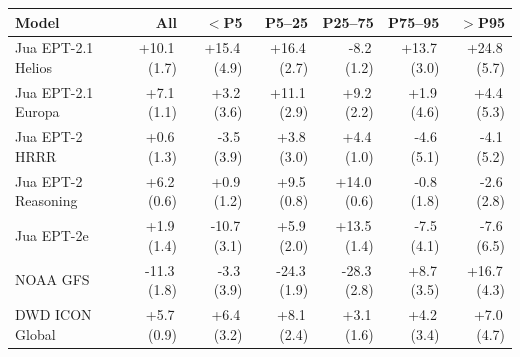\begin{tabular}{@{}lrrrrrr@{}}
\toprule
Model & All & $<$P5 & P5--25 & P25--75 & P75--95 & $>$P95 \\
\midrule
Jua EPT-2.1 Helios & +10.1\,(1.7) & +15.4\,(4.9) & +16.4\,(2.7) & -8.2\,(1.2) & +13.7\,(3.0) & +24.8\,(5.7) \\\addlinespace[0.35em]
Jua EPT-2.1 Europa & +7.1\,(1.1) & +3.2\,(3.6) & +11.1\,(2.9) & +9.2\,(2.2) & +1.9\,(4.6) & +4.4\,(5.3) \\\addlinespace[0.35em]
Jua EPT-2 HRRR & +0.6\,(1.3) & -3.5\,(3.9) & +3.8\,(3.0) & +4.4\,(1.0) & -4.6\,(5.1) & -4.1\,(5.2) \\\addlinespace[0.35em]
Jua EPT-2 Reasoning & +6.2\,(0.6) & +0.9\,(1.2) & +9.5\,(0.8) & +14.0\,(0.6) & -0.8\,(1.8) & -2.6\,(2.8) \\\addlinespace[0.35em]
Jua EPT-2e & +1.9\,(1.4) & -10.7\,(3.1) & +5.9\,(2.0) & +13.5\,(1.4) & -7.5\,(4.1) & -7.6\,(6.5) \\\addlinespace[0.35em]
NOAA GFS & -11.3\,(1.8) & -3.3\,(3.9) & -24.3\,(1.9) & -28.3\,(2.8) & +8.7\,(3.5) & +16.7\,(4.3) \\\addlinespace[0.35em]
DWD ICON Global & +5.7\,(0.9) & +6.4\,(3.2) & +8.1\,(2.4) & +3.1\,(1.6) & +4.2\,(3.4) & +7.0\,(4.7) \\
\bottomrule
\end{tabular}
